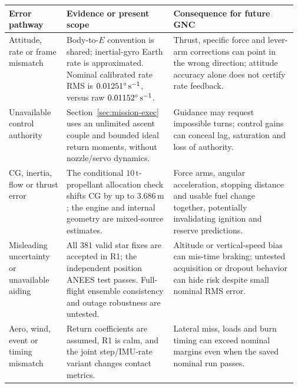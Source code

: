\par\medskip\noindent\begin{minipage}{\linewidth}
\centering\small
\begin{tabularx}{\linewidth}{@{}p{0.20\linewidth}p{0.37\linewidth}X@{}}
\toprule
Error pathway & Evidence or present scope & Consequence for future GNC \\
\midrule
Attitude, rate or frame mismatch & Body-to-$E$ convention is shared; inertial-gyro Earth rate is approximated. Nominal calibrated rate RMS is $0.01251^\circ\,\mathrm{s^{-1}}$, versus raw $0.01152^\circ\,\mathrm{s^{-1}}$. & Thrust, specific force and lever-arm corrections can point in the wrong direction; attitude accuracy alone does not certify rate feedback. \\
Unavailable control authority & Section~\ref{sec:mission-exec} uses an unlimited ascent couple and bounded ideal return moments, without nozzle/servo dynamics. & Guidance may request impossible turns; control gains can conceal lag, saturation and loss of authority. \\
CG, inertia, flow or thrust error & The conditional $10\,\mathrm{t}$-propellant allocation check shifts CG by up to $3.686\,\mathrm{m}$; the engine and internal geometry are mixed-source estimates. & Force arms, angular acceleration, stopping distance and usable fuel change together, potentially invalidating ignition and reserve predictions. \\
Misleading uncertainty or unavailable aiding & All 381 valid star fixes are accepted in R1; the independent position ANEES test passes. Full-flight ensemble consistency and outage robustness are untested. & Altitude or vertical-speed bias can mis-time braking; untested acquisition or dropout behavior can hide risk despite small nominal RMS error. \\
Aero, wind, event or timing mismatch & Return coefficients are assumed, R1 is calm, and the joint step/IMU-rate variant changes contact metrics. & Lateral miss, loads and burn timing can exceed nominal margins even when the saved nominal run passes. \\
\bottomrule
\end{tabularx}
\label{tab:gnc-risks}
\end{minipage}\par\medskip

